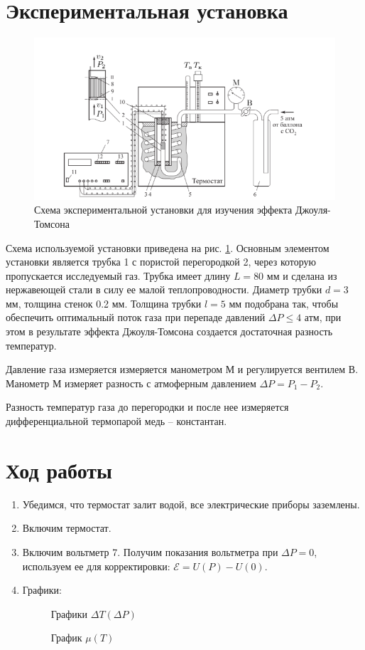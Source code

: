 \documentclass[12pt]{article}
\begin{document}
    \section{Экспериментальная установка}
    \begin{figure}[h]
        \centering
        \includegraphics[scale=3]{stand.png}
        \caption{Схема экспериментальной установки для изучения эффекта Джоуля-Томсона}
        \label{stand}
    \end{figure}
    Схема используемой установки приведена на рис. \ref{stand}. Основным
    элементом установки является трубка 1 с пористой перегородкой 2, через
    которую пропускается исследуемый газ. Трубка имеет длину $L = 80$ мм и
    сделана из нержавеющей стали в силу ее малой теплопроводности. Диаметр
    трубки $d = 3$ мм, толщина стенок 0.2 мм. Толщина трубки $l = 5$ мм 
    подобрана так, чтобы обеспечить оптимальный поток газа при перепаде
    давлений $\Delta P \le 4$ атм, при этом в результате эффекта Джоуля-Томсона
    создается достаточная разность температур. 
    \par Давление газа измеряется измеряется манометром М и регулируется 
    вентилем В. Манометр М измеряет разность с атмоферным давлением 
    $\Delta P = P_1 - P_2$.
    \par Разность температур газа до перегородки и после нее измеряется 
    дифференциальной термопарой медь -- константан.

    \section{Ход работы}
    \begin{enumerate}
        \item Убедимся, что термостат залит водой, все электрические приборы
        заземлены.
        \item Включим термостат.
        \item Включим вольтметр 7. Получим показания вольтметра при $\Delta P = 0$,
        используем ее для корректировки: $\mathscr{E} = U(P) - U(0)$.
        \item Графики:
        \begin{figure}[h]
            \centering
            
            \caption{Графики $\Delta T(\Delta P)$}
        \end{figure}
        \begin{figure}[h]
            \centering
            
            \caption{График $\mu(T)$}
        \end{figure}
    \end{enumerate}
\end{document}
